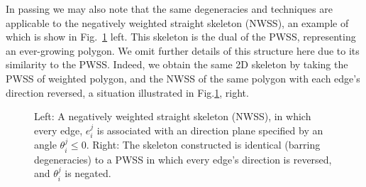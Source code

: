 In passing we may also note that the same degeneracies and techniques are applicable to the negatively weighted straight skeleton (NWSS), an example of which is show in Fig.~\ref{fig:skel_nwss} left. This skeleton is the dual of the PWSS, representing an ever-growing polygon. We omit further details of this structure here due to its similarity to the PWSS. Indeed, we obtain the same 2D skeleton by taking the PWSS of weighted polygon, and the NWSS of the same polygon with each edge's direction reversed, a situation illustrated in Fig.\ref{fig:skel_nwss}, right.

\begin{figure}
  \centering
  \def\svgwidth{1.0\columnwidth}
  
  \caption[A PWSS PCE]{\label{fig:skel_nwss}Left: A negatively weighted straight skeleton (NWSS), in which every edge, $e^j_i$ is associated with an direction plane specified by an angle  $\theta^j_i \le 0$. Right: The skeleton constructed is identical (barring degeneracies) to a PWSS in which every edge's direction is reversed, and  $\theta^j_i$ is negated.}
\end{figure}

\FloatBarrier

















